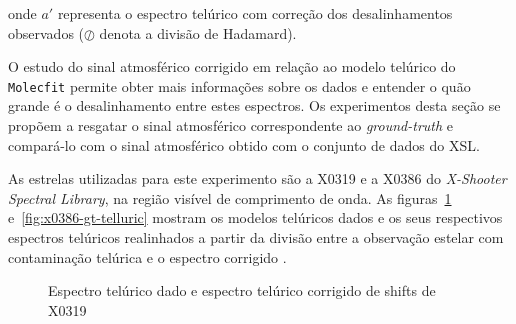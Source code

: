 \noindent onde $a'$ representa o espectro telúrico com correção dos desalinhamentos observados ($\oslash$ denota a divisão de Hadamard).

O estudo do sinal atmosférico corrigido em relação ao modelo telúrico do \texttt{Molecfit} permite obter mais informações sobre os dados e entender o quão grande é o desalinhamento entre estes espectros. Os experimentos desta seção se propõem a resgatar o sinal atmosférico correspondente ao \textit{ground-truth} e compará-lo com o sinal atmosférico obtido com o conjunto de dados do XSL.

As estrelas utilizadas para este experimento são a X0319 e a X0386 do \textit{X-Shooter Spectral Library}, na região visível de comprimento de onda. As figuras~\ref{fig:x0319-gt-telluric} e~\ref{fig:x0386-gt-telluric} mostram os modelos telúricos dados e os seus respectivos espectros telúricos realinhados a partir da divisão entre a observação estelar com contaminação telúrica e o espectro corrigido \citep{unpublished-xshooter-data-release}.

\begin{figure}[htb]
  \centering
  \hfill
  \caption{Espectro telúrico dado e espectro telúrico corrigido de shifts de X0319}
  \label{fig:x0319-gt-telluric}
\end{figure}

